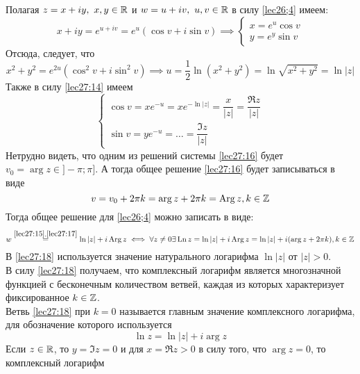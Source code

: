 \documentclass[../../main.tex]{subfiles}
\begin{document}
Полагая $ z = x + iy,\ x, y \in \mathbb{R} $ и $ w = u + iv,\ u, v \in \mathbb{R} $
в силу \eqref{lec26;4} имеем:
\begin{equation}
\label{lec27:14}
x + iy = e^{u + iv} = e^u(\cos v + i\sin v) \implies
\begin{cases}
	x = e^u\cos v\\
	y = e^y\sin v
\end{cases}
\end{equation}
Отсюда, следует, что 
\begin{equation}
\label{lec27:15}
x^2 + y^2 = e^{2u}
(\cos^2 v + i\sin^2 v) \implies 
u = \dfrac{1}{2} \ln(x^2 + y^2) = 
\ln \sqrt{x^2 + y^2} = \ln|z|
\end{equation}
Также в силу \eqref{lec27:14} имеем
\begin{equation}
\label{lec27:16}
\begin{cases}
\cos v = xe^{-u} = xe^{-\ln|z|} = \dfrac{x}{|z|} = \dfrac{\Re z}{|z|}\\
\sin v = ye^{-u} = \dots = \dfrac{\Im z}{|z|}
\end{cases}
\end{equation}
Нетрудно видеть, что одним из решений системы \eqref{lec27:16} будет 
$ v_0 = \arg z \in ]-\pi; \pi] $. А тогда общее решение \eqref{lec27:16}
будет записываться в виде
\begin{equation}
\label{lec27:17}
v = v_0 + 2\pi k = \arg z + 2\pi k = \operatorname{Arg} z, k \in \mathbb{Z}
\end{equation}
Тогда общее решение для \eqref{lec26;4} можно записать в виде:
\begin{equation}
\label{lec27:18}
w 
\stackrel{\eqref{lec27:15}, \eqref{lec27:17}}{=}
\ln |z| + i \operatorname{Arg} z \iff
\forall z \neq 0 \exists \operatorname{Ln} z = \ln |z| + i \operatorname{Arg} z = 
\ln |z| + i(\arg z + 2\pi k), k \in \mathbb{Z}
\end{equation}
В \eqref{lec27:18} используется значение натурального логарифма
$ \ln|z| $ от $ |z| > 0 $.\\
В силу \eqref{lec27:18} получаем, что комплексный логарифм является 
многозначной функцией с бесконечным количеством ветвей, каждая из которых
характеризует фиксированное $ k\in\mathbb{Z} $.\\
Ветвь \eqref{lec27:18} при $ k = 0 $ называется главным значение комплексного
логарифма, для обозначение которого используется 
\begin{equation}
\label{lec27:19}
\ln z = \ln|z| + i\arg z
\end{equation}
Если $ z \in \mathbb{R} $, то $ y = \Im z = 0 $ и для 
$ x = \Re z > 0 $ в силу того, что $ \arg z = 0 $, то комплексный логарифм
\end{document}
